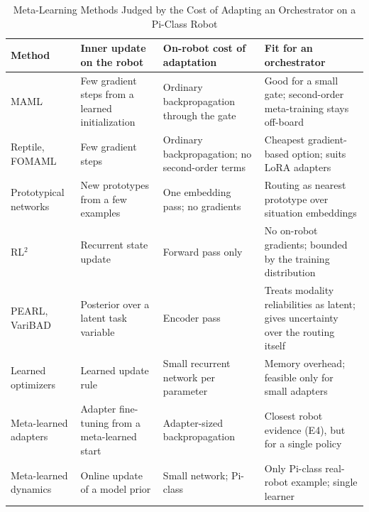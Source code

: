 \documentclass[journal]{IEEEtran}
\begin{document}
\begin{table}[!t]
\centering
\caption{Meta-Learning Methods Judged by the Cost of Adapting an Orchestrator on a Pi-Class Robot}\label{tab:metafit}%
\footnotesize
\begin{tabular}{@{}>{\raggedright\arraybackslash}p{0.17\dimexpr\textwidth-8\tabcolsep\relax}>{\raggedright\arraybackslash}p{0.22\dimexpr\textwidth-8\tabcolsep\relax}>{\raggedright\arraybackslash}p{0.23\dimexpr\textwidth-8\tabcolsep\relax}>{\raggedright\arraybackslash}p{0.38\dimexpr\textwidth-8\tabcolsep\relax}@{}}
\toprule
\textbf{Method} & \textbf{Inner update on the robot} & \textbf{On-robot cost of adaptation} & \textbf{Fit for an orchestrator} \\ \midrule
MAML~\cite{Finn2017} & Few gradient steps from a learned initialization & Ordinary backpropagation through the gate & Good for a small gate; second-order meta-training stays off-board \\
Reptile, FOMAML~\cite{Nichol2018} & Few gradient steps & Ordinary backpropagation; no second-order terms & Cheapest gradient-based option; suits LoRA adapters \\
Prototypical networks~\cite{Snell2017} & New prototypes from a few examples & One embedding pass; no gradients & Routing as nearest prototype over situation embeddings \\
RL$^2$~\cite{Duan2016} & Recurrent state update & Forward pass only & No on-robot gradients; bounded by the training distribution \\
PEARL, VariBAD~\cite{Rakelly2019,Zintgraf2020} & Posterior over a latent task variable & Encoder pass & Treats modality reliabilities as latent; gives uncertainty over the routing itself \\
Learned optimizers~\cite{Andrychowicz2016} & Learned update rule & Small recurrent network per parameter & Memory overhead; feasible only for small adapters \\
Meta-learned adapters~\cite{Zhu2025} & Adapter fine-tuning from a meta-learned start & Adapter-sized backpropagation & Closest robot evidence (E4), but for a single policy \\
Meta-learned dynamics~\cite{Nagabandi2019} & Online update of a model prior & Small network; Pi-class & Only Pi-class real-robot example; single learner \\
\bottomrule
\end{tabular}
\end{table}
\end{document}
